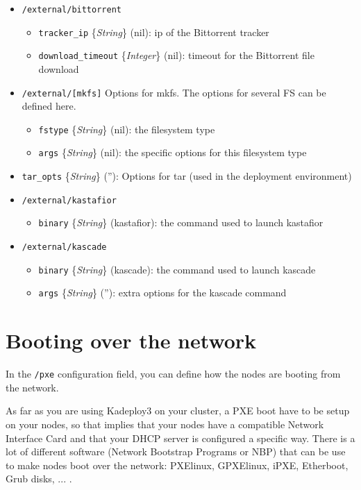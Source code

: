 \documentclass[a4wide,10pt,oneside]{book}
\newcommand{\ypath}[1]{\texttt{#1}}
\newcommand{\yfieldd}[3]{\texttt{#1} {\small\{{\emph{#2}}\}} {\small(}#3{\small)}:}
\begin{document}
\begin{itemize}
  \item \ypath{/external/bittorrent}
  \begin{itemize}
    \item \yfieldd{tracker\_ip}{String}{nil} ip of the Bittorrent tracker
    \item \yfieldd{download\_timeout}{Integer}{nil} timeout for the Bittorrent file download
  \end{itemize}

  \item \ypath{/external/[mkfs]} Options for mkfs. The options for several FS can be defined here.
  \begin{itemize}
    \item \yfieldd{fstype}{String}{nil} the filesystem type
    \item \yfieldd{args}{String}{nil} the specific options for this filesystem type
  \end{itemize}

  \item \yfieldd{tar\_opts}{String}{''} Options for tar (used in the deployment environment)

  \item \ypath{/external/kastafior}
  \begin{itemize}
    \item \yfieldd{binary}{String}{kastafior} the command used to launch kastafior
  \end{itemize}

  \item \ypath{/external/kascade}
  \begin{itemize}
    \item \yfieldd{binary}{String}{kascade} the command used to launch kascade
    \item \yfieldd{args}{String}{''} extra options for the kascade command
  \end{itemize}
\end{itemize}

\section{Booting over the network}\label{sec:netboot}
In the \ypath{/pxe} configuration field, you can define how the nodes are booting from the network.

As far as you are using Kadeploy3 on your cluster, a PXE boot have to be setup on your nodes, so that implies that your nodes have a compatible Network Interface Card and that your DHCP server is configured a specific way. There is a lot of different software (Network Bootstrap Programs or NBP) that can be use to make  nodes boot over the network: PXElinux, GPXElinux, iPXE, Etherboot, Grub disks, ... .
\end{document}

